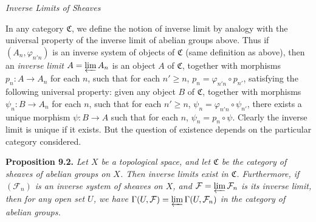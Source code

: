 {\medskip
\noindent\emph{Inverse Limits of Sheaves}\par
\smallskip
In any category $\mathfrak C$, we define the notion of inverse limit by analogy with the universal property of the inverse limit of abelian groups above. Thus if $(A_n,\varphi_{n'n})$ is an inverse system of objects of $\mathfrak C$ (same definition as above), then an \emph{inverse limit} $A=\varprojlim A_n$ is an object $A$ of $\mathfrak C$, together with morphisms $p_n\colon A\to A_n$ for each $n$, such that for each $n'\ge n$, $p_n=\varphi_{n'n}\circ p_{n'}$, satisfying the following universal property: given any object $B$ of $\mathfrak C$, together with morphisms $\psi_n\colon B\to A_n$ for each $n$, such that for each $n'\ge n$, $\psi_n=\varphi_{n'n}\circ\psi_{n'}$, there exists a unique morphism $\psi\colon B\to A$ such that for each $n$, $\psi_n=p_n\circ\psi$. Clearly the inverse limit is unique if it exists. But the question of existence depends on the particular category considered.

\smallskip
\noindent\hypertarget{result-II-9.2}{}\textbf{Proposition 9.2.} \emph{Let $X$ be a topological space, and let $\mathfrak C$ be the category of sheaves of abelian groups on $X$. Then inverse limits exist in $\mathfrak C$. Furthermore, if $(\mathcal F_n)$ is an inverse system of sheaves on $X$, and $\mathcal F=\varprojlim\mathcal F_n$ is its inverse limit, then for any open set $U$, we have $\Gamma(U,\mathcal F)=\varprojlim\Gamma(U,\mathcal F_n)$ in the category of abelian groups.}}
